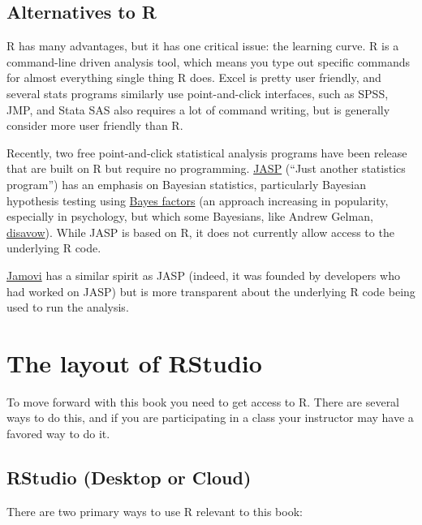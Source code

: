 \documentclass[
]{book}
\begin{document}
\hypertarget{alternatives-to-r}{%
\section{Alternatives to R}\label{alternatives-to-r}}

R has many advantages, but it has one critical issue: the learning curve. R is a command-line driven analysis tool, which means you type out specific commands for almost everything single thing R does. Excel is pretty user friendly, and several stats programs similarly use point-and-click interfaces, such as SPSS, JMP, and Stata SAS also requires a lot of command writing, but is generally consider more user friendly than R.

Recently, two free point-and-click statistical analysis programs have been release that are built on R but require no programming. \href{https://jasp-stats.org/}{JASP} (``Just another statistics program'') has an emphasis on Bayesian statistics, particularly Bayesian hypothesis testing using \href{https://en.wikipedia.org/wiki/Bayes_factor}{Bayes factors} (an approach increasing in popularity, especially in psychology, but which some Bayesians, like Andrew Gelman, \href{http://andrewgelman.com/2011/04/02/so-called_bayes/}{disavow}). While JASP is based on R, it does not currently allow access to the underlying R code.

\href{https://www.jamovi.org/}{Jamovi} has a similar spirit as JASP (indeed, it was founded by developers who had worked on JASP) but is more transparent about the underlying R code being used to run the analysis.

\hypertarget{the-layout-of-rstudio}{%
\chapter{The layout of RStudio}\label{the-layout-of-rstudio}}

To move forward with this book you need to get access to R. There are several ways to do this, and if you are participating in a class your instructor may have a favored way to do it.

\hypertarget{rstudio-desktop-or-cloud}{%
\section{RStudio (Desktop or Cloud)}\label{rstudio-desktop-or-cloud}}

There are two primary ways to use R relevant to this book:
\end{document}
